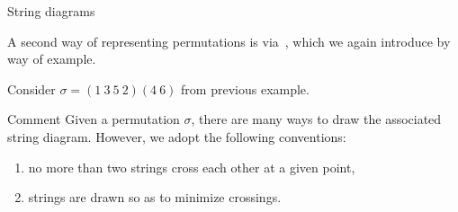\documentclass[9pt]{beamer}
\begin{document}
\begin{frame}{String diagrams}

A second way of representing permutations is via \,, which we again introduce by way of example.

\begin{example}
Consider $\sigma=(1\ 3\ 5\ 2)(4\ 6)$ from previous example. 

\begin{figure}
\end{figure}
\end{example}


\begin{block}{Comment}
Given a permutation $\sigma$, there are many ways to draw the associated string diagram.  However, we adopt the following conventions:
\begin{enumerate}
\item no more than two strings cross each other at a given point,
\item strings are drawn so as to minimize crossings.
\end{enumerate}
\end{block}


\end{frame}

\end{document}
